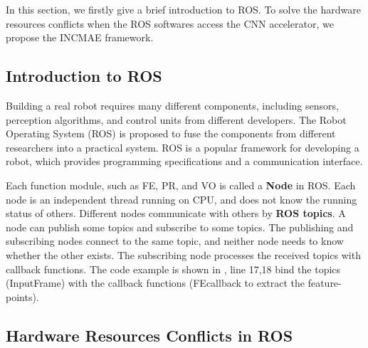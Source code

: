 \label{sec:incame}

In this section, we firstly give a brief introduction to ROS\cite{quigley2009ros}. To solve the hardware resources conflicts when the ROS softwares access the CNN accelerator, we propose the INCMAE framework.




\subsection{Introduction to ROS}
Building a real robot requires many different components, including sensors, perception algorithms, and control units from different developers. The Robot Operating System (ROS) \cite{quigley2009ros} is proposed to fuse the components from different researchers into a practical system. ROS is a popular framework for developing a robot, which provides programming specifications and a communication interface.

Each function module, such as FE, PR, and VO is called a \textbf{Node} in ROS. Each node is an independent thread running on CPU, and does not know the running status of others. Different nodes communicate with others by \textbf{ROS topics}. A node can publish some topics and subscribe to some topics. The publishing and subscribing nodes connect to the same topic, and neither node needs to know whether the other exists. The subscribing node processes the received topics with callback functions. The code example is shown in , line 17,18 bind the topics (InputFrame) with the callback functions (FEcallback to extract the feature-points). 






 

\subsection{Hardware Resources Conflicts in ROS}

